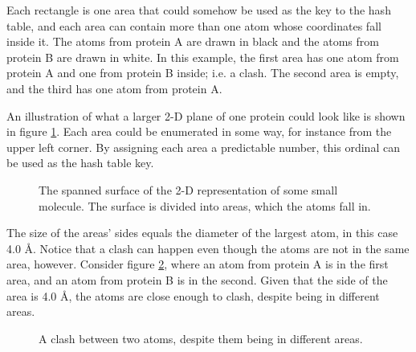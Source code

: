 \documentclass[a4paper]{article}
\begin{document}
Each rectangle is one area that could somehow be used as the key to the hash table, and each area can contain more than one atom whose coordinates fall inside it. The atoms from protein A are drawn in black and the atoms from protein B are drawn in white. In this example, the first area has one atom from protein A and one from protein B inside; i.e. a clash. The second area is empty, and the third has one atom from protein A.

An illustration of what a larger 2-D plane of one protein could look like is shown in figure \ref{fig:2dregionmap}. Each area could be enumerated in some way, for instance from the upper left corner. By assigning each area a predictable number, this ordinal can be used as the hash table key.

\begin{figure}[H]
\centering
{}
\caption{The spanned surface of the 2-D representation of some small molecule. The surface is divided into areas, which the atoms fall in.}
\label{fig:2dregionmap}
\end{figure}

The size of the areas' sides equals the diameter of the largest atom, in this case 4.0 Å. Notice that a clash can happen even though the atoms are not in the same area, however. Consider figure \ref{fig:clashindifferentareas}, where an atom from protein A is in the first area, and an atom from protein B is in the second. Given that the side of the area is 4.0 Å, the atoms are close enough to clash, despite being in different areas.

\begin{figure}[H]
\centering
{}
\caption{A clash between two atoms, despite them being in different areas.}
\label{fig:clashindifferentareas}
\end{figure}
\end{document}
